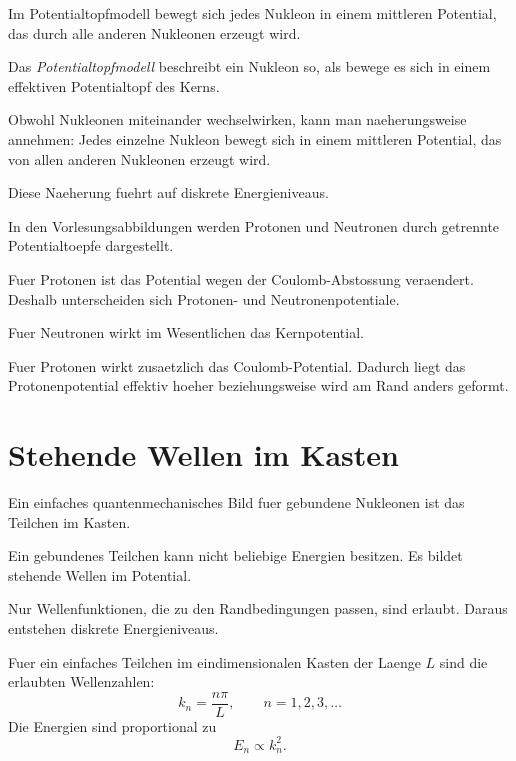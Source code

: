 Im Potentialtopfmodell bewegt sich jedes Nukleon in einem mittleren Potential,
das durch alle anderen Nukleonen erzeugt wird.

\begin{definitionbox}
Das \emph{Potentialtopfmodell} beschreibt ein Nukleon so, als bewege es sich in
einem effektiven Potentialtopf des Kerns.
\end{definitionbox}

\begin{conceptbox}
Obwohl Nukleonen miteinander wechselwirken, kann man naeherungsweise annehmen:
Jedes einzelne Nukleon bewegt sich in einem mittleren Potential, das von allen
anderen Nukleonen erzeugt wird.

Diese Naeherung fuehrt auf diskrete Energieniveaus.
\end{conceptbox}

\begin{notebox}
In den Vorlesungsabbildungen werden Protonen und Neutronen durch getrennte
Potentialtoepfe dargestellt.

Fuer Protonen ist das Potential wegen der Coulomb-Abstossung veraendert.
Deshalb unterscheiden sich Protonen- und Neutronenpotentiale.
\end{notebox}

\begin{conceptbox}
Fuer Neutronen wirkt im Wesentlichen das Kernpotential.

Fuer Protonen wirkt zusaetzlich das Coulomb-Potential.
Dadurch liegt das Protonenpotential effektiv hoeher beziehungsweise wird am Rand
anders geformt.
\end{conceptbox}

\section{Stehende Wellen im Kasten}

Ein einfaches quantenmechanisches Bild fuer gebundene Nukleonen ist das Teilchen
im Kasten.

\begin{conceptbox}
Ein gebundenes Teilchen kann nicht beliebige Energien besitzen.
Es bildet stehende Wellen im Potential.

Nur Wellenfunktionen, die zu den Randbedingungen passen, sind erlaubt.
Daraus entstehen diskrete Energieniveaus.
\end{conceptbox}

\begin{formulabox}
Fuer ein einfaches Teilchen im eindimensionalen Kasten der Laenge $L$ sind die
erlaubten Wellenzahlen:
\begin{equation*}
    k_n = \frac{n\pi}{L},
    \qquad
    n=1,2,3,\ldots
\end{equation*}
Die Energien sind proportional zu
\begin{equation*}
    E_n \propto k_n^2.
\end{equation*}
\end{formulabox}

